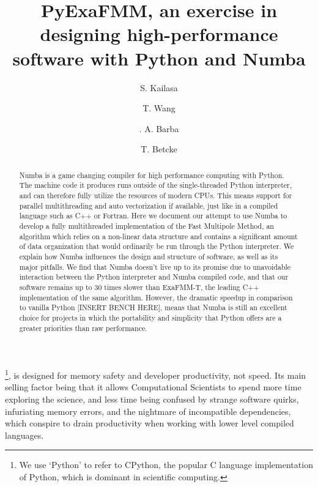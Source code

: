 \documentclass{IEEEcsmag}
\begin{document}

\title{PyExaFMM, an exercise in designing high-performance software with Python and Numba}

\author{S. Kailasa}

\author{T. Wang}

\author{. A. Barba}

\author{T. Betcke}


\begin{abstract}
Numba is a game changing compiler for high performance computing with Python. The machine code it produces runs outside of the single-threaded Python interpreter, and can therefore fully utilize the resources of modern CPUs. This means support for parallel multithreading and auto vectorization if available, just like in a compiled language such as C++ or Fortran. Here we document our attempt to use Numba to develop a fully multithreaded implementation of the Fast Multipole Method, an algorithm which relies on a non-linear data structure and contains a significant amount of data organization that would ordinarily be run through the Python interpreter. We explain how Numba influences the design and structure of software, as well as its major pitfalls. We find that Numba doesn't live up to its promise due to unavoidable interaction between the Python interpreter and Numba compiled code, and that our software remains up to 30 times slower than ExaFMM-T, the leading C++ implementation of the same algorithm. However, the dramatic speedup in comparison to vanilla Python [INSERT BENCH HERE], means that Numba is still an excellent choice for projects in which the portability and simplicity that Python offers are a greater priorities than raw performance.
\end{abstract}

\maketitle
{}\footnote{We use `Python' to refer to CPython, the popular C language implementation of Python, which is dominant in scientific computing.}, is designed for memory safety and developer productivity, not speed. Its main selling factor being that it allows Computational Scientists to spend more time exploring the science, and less time being confused by strange software quirks, infuriating memory errors, and the nightmare of incompatible dependencies, which conspire to drain productivity when working with lower level compiled languages.
\end{document}
